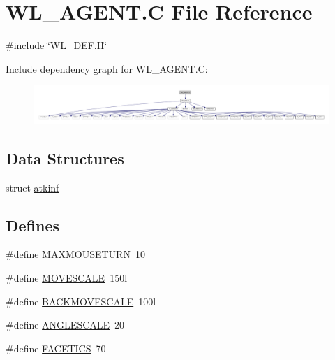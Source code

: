 \hypertarget{WL__AGENT_8C}{
\section{WL\_\-AGENT.C File Reference}
\label{WL__AGENT_8C}
}
{\ttfamily \#include \char`\"{}WL\_\-DEF.H\char`\"{}}\par
Include dependency graph for WL\_\-AGENT.C:
\nopagebreak
\begin{figure}[H]
\begin{center}
\leavevmode
\includegraphics[width=400pt]{WL__AGENT_8C__incl}
\end{center}
\end{figure}
\subsection*{Data Structures}
\begin{DoxyCompactItemize}
\item 
struct \hyperlink{structatkinf}{atkinf}
\end{DoxyCompactItemize}
\subsection*{Defines}
\begin{DoxyCompactItemize}
\item 
\#define \hyperlink{WL__AGENT_8C_adb1a33704348cfb6b7e24b5adbae7598}{MAXMOUSETURN}~10
\item 
\#define \hyperlink{WL__AGENT_8C_addd337c4e652effc84b749baf914107b}{MOVESCALE}~150l
\item 
\#define \hyperlink{WL__AGENT_8C_ae0376bd5f21024fe8205b6d59d54e6d9}{BACKMOVESCALE}~100l
\item 
\#define \hyperlink{WL__AGENT_8C_a3ab7501145c7f7bd3f4c5c76589e5863}{ANGLESCALE}~20
\item 
\#define \hyperlink{WL__AGENT_8C_ada7d88a2854f689de2c9cccf791e44eb}{FACETICS}~70
\end{DoxyCompactItemize}
